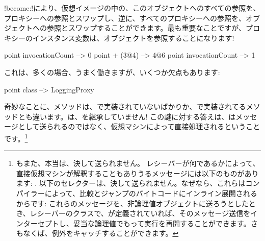 \documentclass[a4paper,10pt,twoside]{book}
\begin{document}
\ct!become:!により、仮想イメージの中の、このオブジェクトへのすべての参照を、プロキシーへの参照とスワップし、逆に、すべてのプロキシーへの参照を、オブジェクトへの参照とスワップすることができます。最も重要なことですが、プロキシーのインスタンス変数は、オブジェクトを参照することになります!

\begin{code}{}
point invocationCount --> 0
point + (3@4)             --> 4@6
point invocationCount --> 1
\end{code}

これは、多くの場合、うまく働きますが、いくつか欠点もあります:
\begin{code}{}
point class --> LoggingProxy
\end{code}
奇妙なことに、メソッドは、で実装されていないばかりか、で実装されてるメソッドとも違います。は、を継承していません!
この謎に対する答えは、はメッセージとして送られるのではなく、仮想マシンによって直接処理されるということです。\footnote{もまた、本当は、決して送られません。
レシーバーが何であるかによって、直接仮想マシンが解釈することもありうるメッセージには以下のものがあります:
\ct{+- < > <= >= = ~= * / \ ==}
.
以下のセレクターは、決して送られません。なぜなら、これらはコンパイラーによって、比較とジャンプのバイトコードにインライン展開されるからです:
これらのメッセージを、非論理値オブジェクトに送ろうとしたとき、レシーバーのクラスで、が定義されていれば、そのメッセージ送信をインターセプトし、妥当な論理値でもって実行を再開することができます。さもなくば、例外をキャッチすることができます。
}%
\end{document}
